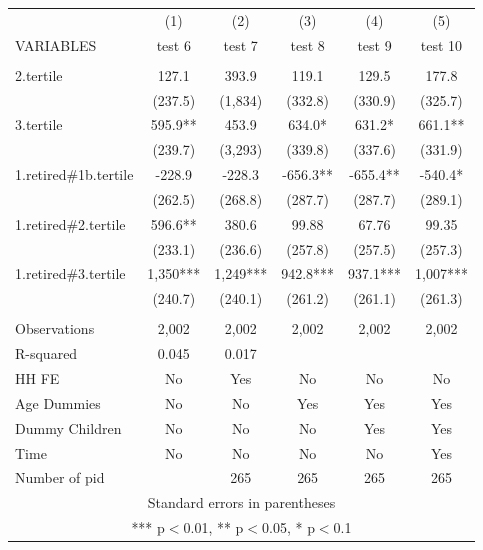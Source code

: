 \begin{tabular}{lccccc} \hline
 & (1) & (2) & (3) & (4) & (5) \\
VARIABLES & test 6 & test 7 & test 8 & test 9 & test 10 \\ \hline
 &  &  &  &  &  \\
2.tertile & 127.1 & 393.9 & 119.1 & 129.5 & 177.8 \\
 & (237.5) & (1,834) & (332.8) & (330.9) & (325.7) \\
3.tertile & 595.9** & 453.9 & 634.0* & 631.2* & 661.1** \\
 & (239.7) & (3,293) & (339.8) & (337.6) & (331.9) \\
1.retired\#1b.tertile & -228.9 & -228.3 & -656.3** & -655.4** & -540.4* \\
 & (262.5) & (268.8) & (287.7) & (287.7) & (289.1) \\
1.retired\#2.tertile & 596.6** & 380.6 & 99.88 & 67.76 & 99.35 \\
 & (233.1) & (236.6) & (257.8) & (257.5) & (257.3) \\
1.retired\#3.tertile & 1,350*** & 1,249*** & 942.8*** & 937.1*** & 1,007*** \\
 & (240.7) & (240.1) & (261.2) & (261.1) & (261.3) \\
 &  &  &  &  &  \\
Observations & 2,002 & 2,002 & 2,002 & 2,002 & 2,002 \\
R-squared & 0.045 & 0.017 &  &  &  \\
HH FE & No & Yes & No & No & No \\
Age Dummies & No & No & Yes & Yes & Yes \\
Dummy Children & No & No & No & Yes & Yes \\
Time & No & No & No & No & Yes \\
 Number of pid &  & 265 & 265 & 265 & 265 \\ \hline
\multicolumn{6}{c}{ Standard errors in parentheses} \\
\multicolumn{6}{c}{ *** p$<$0.01, ** p$<$0.05, * p$<$0.1} \\
\end{tabular}
